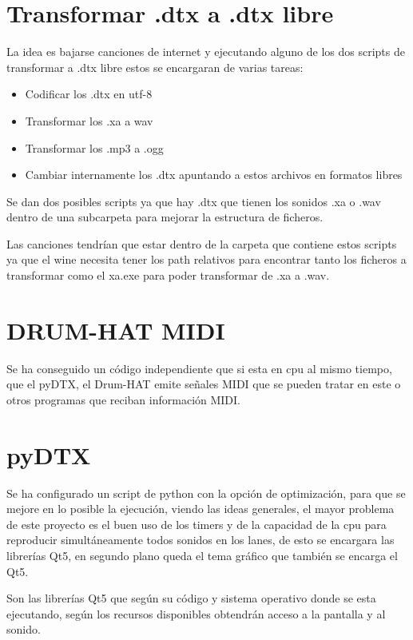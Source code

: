 \documentclass[a4paper,11pt,oneside]{book}
\begin{document}
\section{Transformar .dtx a .dtx libre}

La idea es bajarse canciones de internet y ejecutando alguno de los dos scripts de transformar a .dtx libre estos se encargaran de varias tareas:

\begin{itemize}
   \item Codificar los .dtx en utf-8
   \item Transformar los .xa a wav
   \item Transformar los .mp3 a .ogg
   \item Cambiar internamente los .dtx apuntando a estos archivos en formatos libres
 \end{itemize}

Se dan dos posibles scripts ya que hay .dtx que tienen los sonidos .xa o .wav dentro de una subcarpeta para mejorar la estructura de ficheros.

Las canciones tendrían que estar dentro de la carpeta que contiene estos scripts ya que el wine necesita tener los path relativos para encontrar tanto los ficheros a transformar como el xa.exe para poder transformar de .xa a .wav.

\section{DRUM-HAT MIDI}

Se ha conseguido un código independiente que si esta en cpu al mismo tiempo, que el pyDTX, el Drum-HAT emite señales MIDI que se pueden tratar en este o otros programas que reciban información MIDI.

\section{pyDTX}

Se ha configurado un script de python con la opción de optimización, para que se mejore en lo posible la ejecución, viendo las ideas generales, el mayor problema de este proyecto es el buen uso de los timers y de la capacidad de la cpu para reproducir simultáneamente todos sonidos en los lanes, de esto se encargara las librerías Qt5, en segundo plano queda el tema gráfico que también se encarga el Qt5.

Son las librerías Qt5 que según su código y sistema operativo donde se esta ejecutando, según los recursos disponibles obtendrán acceso a la pantalla y al sonido. 
\end{document}
